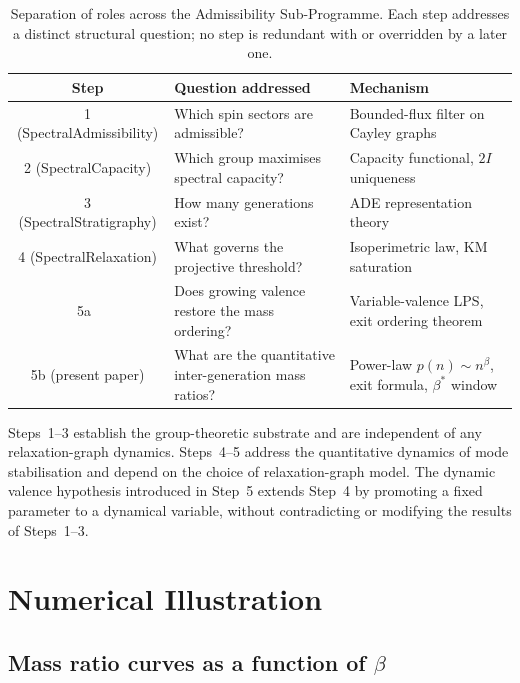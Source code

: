 \documentclass[11pt,a4paper]{article}
\begin{document}
      \begin{table}[ht]
        \centering
        \caption{%
          Separation of roles across the Admissibility Sub-Programme.
          Each step addresses a distinct structural question;
          no step is redundant with or overridden by a later one.%
        }
        \label{tab:architecture}
        \smallskip
        \begin{tabular}{cll}
          \toprule
          Step & Question addressed & Mechanism \\
          \midrule
          1 (SpectralAdmissibility) &
          Which spin sectors are admissible? &
          Bounded-flux filter on Cayley graphs \\
          2 (SpectralCapacity) &
          Which group maximises spectral capacity? &
          Capacity functional, $2I$ uniqueness \\
          3 (SpectralStratigraphy) &
          How many generations exist? &
          ADE representation theory \\
          4 (SpectralRelaxation) &
          What governs the projective threshold? &
          Isoperimetric law, KM saturation \\
          5a~\cite{Beau2026a6} &
          Does growing valence restore the mass ordering? &
          Variable-valence LPS, exit ordering theorem \\
          5b (present paper) &
          What are the quantitative inter-generation mass ratios? &
          Power-law $p(n)\sim n^\beta$, exit formula, $\beta^*$ window \\
          \bottomrule
        \end{tabular}
      \end{table}

      \noindent
      Steps~1--3 establish the group-theoretic substrate and are independent of
      any relaxation-graph dynamics.
      Steps~4--5 address the quantitative dynamics of mode stabilisation
      and depend on the choice of relaxation-graph model.
      The dynamic valence hypothesis introduced in Step~5 extends Step~4
      by promoting a fixed parameter to a dynamical variable,
      without contradicting or modifying the results of Steps~1--3.

  \section{Numerical Illustration}
    \label{sec:numerical}

    \subsection{Mass ratio curves as a function of $\beta$}
      \label{subsec:curves}
\end{document}
